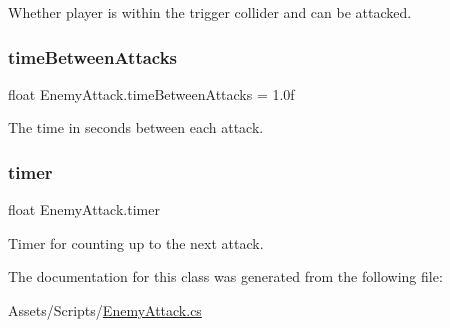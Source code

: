 Whether player is within the trigger collider and can be attacked. \mbox{\label{class_enemy_attack_afe49a1e89582f259547fe3e97cd14b4f}} 
\subsubsection{\texorpdfstring{timeBetweenAttacks}{timeBetweenAttacks}}
{\footnotesize\ttfamily float Enemy\+Attack.\+time\+Between\+Attacks = 1.\+0f}

The time in seconds between each attack. \mbox{\label{class_enemy_attack_a0040c75208554b4fa78eccf289c206af}} 
\subsubsection{\texorpdfstring{timer}{timer}}
{\footnotesize\ttfamily float Enemy\+Attack.\+timer\hspace{0.3cm}{\ttfamily [private]}}

Timer for counting up to the next attack. 

The documentation for this class was generated from the following file\+:\begin{DoxyCompactItemize}
\item 
Assets/\+Scripts/\mbox{\hyperlink{_enemy_attack_8cs}{Enemy\+Attack.\+cs}}\end{DoxyCompactItemize}
